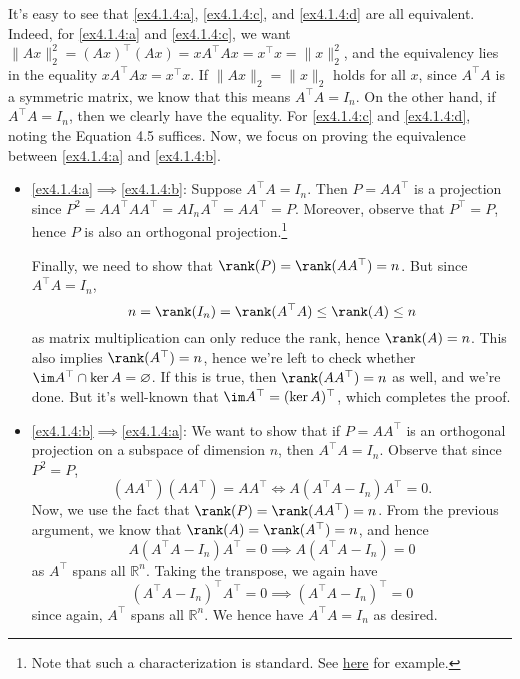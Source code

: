\begin{answer}
	It's easy to see that \autoref{ex4.1.4:a}, \autoref{ex4.1.4:c}, and \autoref{ex4.1.4:d} are all equivalent. Indeed, for \autoref{ex4.1.4:a} and \autoref{ex4.1.4:c}, we want \(\lVert Ax \rVert _2^2 = (Ax)^{\top} (Ax) = x A^{\top} A x = x^{\top} x = \lVert x \rVert _2^2\), and the equivalency lies in the equality \(x A^{\top} A x = x^{\top} x\). If \(\lVert Ax \rVert _2 = \lVert x \rVert _2\) holds for all \(x\), since \(A^{\top} A\) is a symmetric matrix, we know that this means \(A^{\top} A = I_n\). On the other hand, if \(A^{\top} A = I_n\), then we clearly have the equality. For \autoref{ex4.1.4:c} and \autoref{ex4.1.4:d}, noting the Equation 4.5 suffices. Now, we focus on proving the equivalence between \autoref{ex4.1.4:a} and \autoref{ex4.1.4:b}.

	\begin{itemize}
		\item \autoref{ex4.1.4:a}\(\implies \)\autoref{ex4.1.4:b}: Suppose \(A^{\top} A = I_n\). Then \(P = A A^{\top} \) is a projection since \(P^2 = A A^{\top} A A^{\top} = A I_n A^{\top} = A A^{\top} = P\). Moreover, observe that \(P^{\top} = P\), hence \(P\) is also an orthogonal projection.\footnote{Note that such a characterization is standard. See \href{https://math.stackexchange.com/questions/2485525/why-is-orthogonal-projection-matrix-has-property-that-p-pt/2485644\#2485644}{here} for example.}

		      Finally, we need to show that \(\rank (P) = \rank (A A^{\top} ) = n\). But since \(A^{\top} A = I_n\),
		      \[
			      n
			      = \rank (I_n)
			      = \rank (A^{\top} A)
			      \leq \rank (A)
			      \leq n
		      \]
		      as matrix multiplication can only reduce the rank, hence \(\rank (A) = n\). This also implies \(\rank (A^{\top} ) = n\), hence we're left to check whether \(\im A^{\top} \cap \ker A = \varnothing \). If this is true, then \(\rank (A A^{\top} ) = n\) as well, and we're done. But it's well-known that \(\im A^{\top} = (\ker A)^{\top} \), which completes the proof.
		\item \autoref{ex4.1.4:b}\(\implies \)\autoref{ex4.1.4:a}: We want to show that if \(P = A A^{\top} \) is an orthogonal projection on a subspace of dimension \(n\), then \(A^{\top} A=I_n\). Observe that since \(P^2 = P\),
		      \[
			      (A A^{\top} )(A A^{\top} ) = A A^{\top}
			      \iff A(A^{\top} A - I_n)A^{\top} = 0.
		      \]
		      Now, we use the fact that \(\rank (P) = \rank (A A^{\top} )=n\). From the previous argument, we know that \(\rank (A) = \rank (A^{\top} ) =n\), and hence
		      \[
			      A(A^{\top} A - I_n)A^{\top} = 0
			      \implies A(A^{\top} A - I_n) = 0
		      \]
		      as \(A^{\top} \) spans all \(\mathbb{R} ^n\). Taking the transpose, we again have
		      \[
			      (A^{\top} A - I_n)^{\top} A^{\top} = 0
			      \implies (A^{\top} A - I_n)^{\top} = 0
		      \]
		      since again, \(A^{\top} \) spans all \(\mathbb{R} ^n\). We hence have \(A^{\top} A = I_n\) as desired.
	\end{itemize}
\end{answer}

